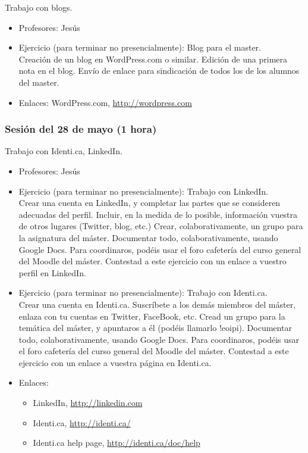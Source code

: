 \documentclass[a4paper,12pt]{article}
\begin{document}
Trabajo con blogs.

\begin{itemize}
\item Profesores: Jesús
\item Ejercicio (para terminar no presencialmente): Blog para el master. \\
Creación de un blog en WordPress.com o similar. Edición de una primera nota en el blog. Envío de enlace para sindicación de todos los de los alumnos del master.
\item Enlaces: WordPress.com, \url{http://wordpress.com}
\end{itemize}

\subsubsection{Sesión del 28 de mayo (1 hora)}

Trabajo con Identi.ca, LinkedIn.

\begin{itemize}
\item Profesores: Jesús
\item Ejercicio (para terminar no presencialmente): Trabajo con LinkedIn. \\
  Crear una cuenta en LinkedIn, y completar las partes que se consideren adecuadas del perfil. Incluir, en la medida de lo posible, información vuestra de otros lugares (Twitter, blog, etc.) Crear, colaborativamente, un grupo para la asignatura del máster. Documentar todo, colaborativamente, usando Google Docs. Para coordinaros, podéis usar el foro cafetería del curso general del Moodle del máster. Contestad a este ejercicio con un enlace a vuestro perfil en LinkedIn.
\item Ejercicio (para terminar no presencialmente): Trabajo con Identi.ca. \\
  Crear una cuenta en Identi.ca. Suscríbete a los demás miembros del máster, enlaza con tu cuentas en Twitter, FaceBook, etc. Cread un grupo para la temática del máster, y apuntaros a él (podéis llamarlo !eoipi). Documentar todo, colaborativamente, usando Google Docs. Para coordinaros, podéis usar el foro cafetería del curso general del Moodle del máster. Contestad a este ejercicio con un enlace a vuestra página en Identi.ca.
\item Enlaces:
  \begin{itemize}
  \item LinkedIn, \url{http://linkedin.com}
  \item Identi.ca, \url{http://identi.ca/}
  \item Identi.ca help page, \url{http://identi.ca/doc/help}
  \end{itemize}
\end{itemize}
\end{document}
